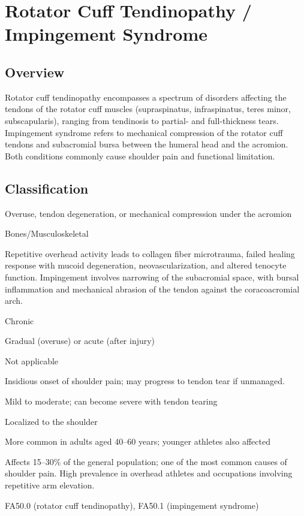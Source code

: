 \chapter{Rotator Cuff Tendinopathy / Impingement Syndrome}
\label{sec:Rotator Cuff Tendinopathy / Impingement Syndrome}

\section{Overview}
Rotator cuff tendinopathy encompasses a spectrum of disorders affecting the tendons of the rotator cuff muscles (supraspinatus, infraspinatus, teres minor, subscapularis), ranging from tendinosis to partial- and full-thickness tears. Impingement syndrome refers to mechanical compression of the rotator cuff tendons and subacromial bursa between the humeral head and the acromion. Both conditions commonly cause shoulder pain and functional limitation.

\section{Classification}
\begin{description}[font=\normalfont\bfseries,leftmargin=3em,labelwidth=2.5em]
  \item[Cause] Overuse, tendon degeneration, or mechanical compression under the acromion
  \item[Organ System] Bones/Musculoskeletal
  \item[Pathophysiology] Repetitive overhead activity leads to collagen fiber microtrauma, failed healing response with mucoid degeneration, neovascularization, and altered tenocyte function. Impingement involves narrowing of the subacromial space, with bursal inflammation and mechanical abrasion of the tendon against the coracoacromial arch.
  \item[Duration] Chronic
  \item[Onset] Gradual (overuse) or acute (after injury)
  \item[Mode of Transmission] Not applicable
  \item[Clinical Course] Insidious onset of shoulder pain; may progress to tendon tear if unmanaged.
  \item[Severity] Mild to moderate; can become severe with tendon tearing
  \item[Extent of Disease] Localized to the shoulder
  \item[Age Group] More common in adults aged 40--60 years; younger athletes also affected
  \item[Epidemiology] Affects 15--30\% of the general population; one of the most common causes of shoulder pain. High prevalence in overhead athletes and occupations involving repetitive arm elevation.
  \item[ICD-11 Code] FA50.0 (rotator cuff tendinopathy), FA50.1 (impingement syndrome)
\end{description}

